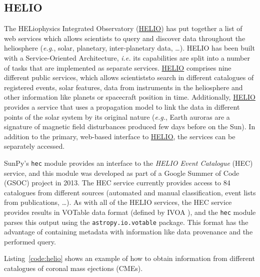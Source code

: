 \subsection{HELIO}\label{ssec:helio}

The HELiophysics Integrated Observatory (\href{http://helio-vo.eu}{HELIO}) has 
put together a list of web services which allows scientists to query and 
discover data throughout the heliosphere (\textit{e.g.}, solar, planetary, 
inter-planetary data, \ldots)\citep{dps2012}.
HELIO has been built with a Service-Oriented Architecture, 
\textit{i.e.} its capabilities are split into a number of tasks that are 
implemented as separate services. 
\href{http://helio-vo.eu}{HELIO} comprises nine different public services, 
which allows scientiststo search in different catalogues of registered events, 
solar features, data from instruments in the heliosphere and other information 
like planets or spacecraft position in time. 
Additionally, \href{http://helio-vo.eu}{HELIO} provides a service that uses a 
propagation model to link the data in different points of the solar system by 
its original nature (\textit{e.g.}, Earth auroras are a signature of magnetic 
field disturbances produced few days before on the Sun).
In addition to the primary, web-based interface to 
\href{http://helio-vo.eu}{HELIO}, the services can be separately accessed.

SunPy's \texttt{hec} module provides an interface to the
\textit{HELIO Event Catalogue} (HEC) service, and this module was developed as
part of a Google Summer of Code (GSOC) project in 2013.
The HEC service currently provides access to 84 catalogues from different
sources (automated and manual classification, event lists from publications, \ldots).
As with all of the HELIO services, the HEC service provides results in VOTable 
data format (defined by IVOA \cite{ochsenbein_ivoa_2011}), and the \texttt{hec}
module parses this output using the \texttt{astropy.io.votable} package.
This format has the advantage of containing metadata with information like
data provenance and the performed query.

Listing~\ref{code:helio} shows an example of how to obtain information
from different catalogues of coronal mass ejections (CMEs).

